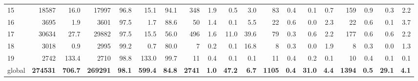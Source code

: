 \begin{tabular}{lrrrrrrrrrrrrrrrrrr}
15 & 18587 & 16.0 & 17997 & 96.8 & 15.1 & 94.1 & 348 & 1.9 & 0.5 & 3.0 & 83 & 0.4 & 0.1 & 0.7 & 159 & 0.9 & 0.3 & 2.2 \\
16 & 3695 & 1.9 & 3601 & 97.5 & 1.7 & 88.6 & 50 & 1.4 & 0.1 & 5.5 & 22 & 0.6 & 0.0 & 2.3 & 22 & 0.6 & 0.1 & 3.7 \\
17 & 30634 & 27.7 & 29882 & 97.5 & 15.5 & 56.0 & 496 & 1.6 & 11.0 & 39.6 & 79 & 0.3 & 0.6 & 2.2 & 177 & 0.6 & 0.6 & 2.2 \\
18 & 3018 & 0.9 & 2995 & 99.2 & 0.7 & 80.0 & 7 & 0.2 & 0.1 & 16.8 & 8 & 0.3 & 0.0 & 1.9 & 8 & 0.3 & 0.0 & 1.3 \\
19 & 2742 & 133.4 & 2710 & 98.8 & 133.0 & 99.7 & 11 & 0.4 & 0.1 & 0.1 & 11 & 0.4 & 0.2 & 0.1 & 10 & 0.4 & 0.1 & 0.1 \\
global & \textbf{274531} & \textbf{706.7} & \textbf{269291} & \textbf{98.1} & \textbf{599.4} & \textbf{84.8} & \textbf{2741} & \textbf{1.0} & \textbf{47.2} & \textbf{6.7} & \textbf{1105} & \textbf{0.4} & \textbf{31.0} & \textbf{4.4} & \textbf{1394} & \textbf{0.5} & \textbf{29.1} & \textbf{4.1} \\
\end{tabular}

